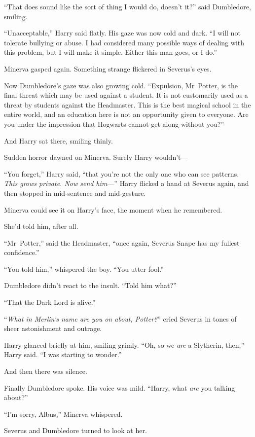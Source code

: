 “That does sound like the sort of thing I would do, doesn’t it?” said Dumbledore, smiling.

“Unacceptable,” Harry said flatly. His gaze was now cold and dark. “I will not tolerate bullying or abuse. I had considered many possible ways of dealing with this problem, but I will make it simple. Either this man goes, or I do.”

Minerva gasped again. Something strange flickered in Severus’s eyes.

Now Dumbledore’s gaze was also growing cold. “Expulsion, Mr~Potter, is the final threat which may be used against a student. It is not customarily used as a threat by students against the Headmaster. This is the best magical school in the entire world, and an education here is not an opportunity given to everyone. Are you under the impression that Hogwarts cannot get along without you?”

And Harry sat there, smiling thinly.

Sudden horror dawned on Minerva. Surely Harry wouldn’t—

“You forget,” Harry said, “that you’re not the only one who can see patterns. \emph{This grows private. Now send him}—” Harry flicked a hand at Severus again, and then stopped in mid-sentence and mid-gesture.

Minerva could see it on Harry’s face, the moment when he remembered.

She’d told him, after all.

“Mr~Potter,” said the Headmaster, “once again, Severus Snape has my fullest confidence.”

“You told him,” whispered the boy. “You utter fool.”

Dumbledore didn’t react to the insult. “Told him what?”

“That the Dark Lord is alive.”

“\emph{What in Merlin’s name are you on about, Potter?}” cried Severus in tones of sheer astonishment and outrage.

Harry glanced briefly at him, smiling grimly. “Oh, so we \emph{are} a Slytherin, then,” Harry said. “I was starting to wonder.”

And then there was silence.

Finally Dumbledore spoke. His voice was mild. “Harry, what \emph{are} you talking about?”

“I’m sorry, Albus,” Minerva whispered.

Severus and Dumbledore turned to look at her.

